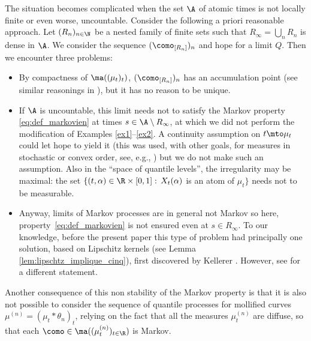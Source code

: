The situation becomes complicated when the set $\A$ of atomic times is not locally finite or even worse, uncountable. Consider the following a priori reasonable approach. Let $(R_n)_{n\in \N}$ be a nested family of finite sets such that $R_\infty=\bigcup_n R_n$ is dense in $\A$. We consider the sequence $(\como_{[R_n]})_n$ \label{page:tentative_limite} and hope for a limit $Q$. Then we encounter three problems:
\begin{itemize}
\item
By compactness of $\ma((\mu_t)_t)$, $(\como_{[R_n]})_n$ has an accumulation point (see similar reasonings in \cite{HiRo13,Ju_ejp,KaKr,Lis,Vi2}), but it has no reason to be unique.

\item
If $\A$ is uncountable, this limit needs not to satisfy the Markov property \eqref{eq:def_markovien} at times $s\in\A\setminus R_\infty$, at which we did not perform the modification of Examples \ref{ex1}--\ref{ex2}. A continuity assumption on $t\mto \mu_t$ could let hope to yield it (this was used, with other goals, for measures in stochastic or convex order, see, e.g., \cite{BHS,HiRoYo14}) but we do not make such an assumption. Also in the ``space of quantile levels'', the irregularity may be maximal: the set $\{(t,\alpha)\in\R\times[0,1]:\,X_t(\alpha)$ is an atom of $\mu_t\}$ needs not to be measurable.

\item
Anyway, limits of Markov processes are in general not Markov so here, property~\eqref{eq:def_markovien} is not ensured even at $s\in R_\infty$. To our knowledge, before the present paper this type of problem had principally one solution, based on Lipschitz kernels (see Lemma \ref{lem:lipschtz_implique_cinq}), first discovered by Kellerer \cite{Ke72,Low,HiRoYo14,BeJu16, BHS}. However, see \cite[Lem.\,5.3]{Naga} for a different statement.
\end{itemize}
Another consequence of this non stability of the Markov property is that it is also not possible to consider the sequence of quantile processes for mollified curves $\mu^{(n)}=(\mu_t\ast \theta_n)_t$, relying on the fact that all the measures $\mu_t^{(n)}$ are diffuse, so that each $\como\in\ma((\mu^{(n)}_t)_{t\in\R})$ is Markov.\enlargethispage{.5\baselineskip}%

